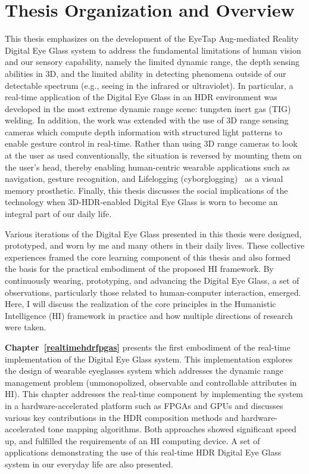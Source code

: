 \section{Thesis Organization and Overview}
This thesis emphasizes on the development of the EyeTap Aug-mediated Reality Digital Eye Glass 
system to address the fundamental limitations of human vision and our sensory capability, namely the 
limited dynamic range, the depth sensing abilities in 3D, and the limited ability in detecting 
phenomena outside of our detectable spectrum (e.g., seeing in the infrared or ultraviolet). In particular, 
a real-time application of the Digital Eye Glass in an HDR environment was developed in the most 
extreme dynamic range scene: tungsten inert gas (TIG) welding.  In addition, the work was extended 
with the use of 3D range sensing cameras which compute depth information with structured light 
patterns to enable gesture control in real-time.  Rather than using 3D range cameras to look at the 
user as used conventionally, the situation is reversed by mounting them on the user's head, thereby 
enabling human-centric wearable applications such as navigation, gesture recognition, and 
Lifelogging (cyborglogging)~\cite{mann2006cyborglogging} as a visual memory prosthetic. Finally, this 
thesis discusses the social implications of the technology when 3D-HDR-enabled Digital Eye Glass is 
worn to become an integral part of our daily life.

Various iterations of the Digital Eye Glass presented in this thesis were designed, prototyped, and 
worn by me and many others in their daily lives. These collective experiences framed the core 
learning component of this thesis and also formed the basis for the practical embodiment of the 
proposed HI framework. By continuously wearing, prototyping, and advancing the Digital Eye Glass, a 
set of observations, particularly those related to human-computer interaction, emerged. Here, I will 
discuss the realization of the core principles in the Humanistic Intelligence (HI) framework in practice 
and how multiple directions of research were taken. 


\textbf{Chapter~\ref{realtimehdrfpgas}} presents the first embodiment of the real-time implementation 
of the Digital Eye Glass system. This implementation explores the design of wearable eyeglasses 
system which addresses the dynamic range management problem (unmonopolized, observable and 
controllable attributes in HI). This chapter addresses the real-time component by implementing the 
system in a hardware-accelerated platform such as FPGAs and GPUs and discusses various key 
contributions in the HDR composition methods and hardware-accelerated tone mapping algorithms. 
Both approaches showed significant speed up, and fulfilled the requirements of an HI computing 
device. A set of applications demonstrating the use of this real-time HDR Digital Eye Glass system in 
our everyday life are also presented.
 
